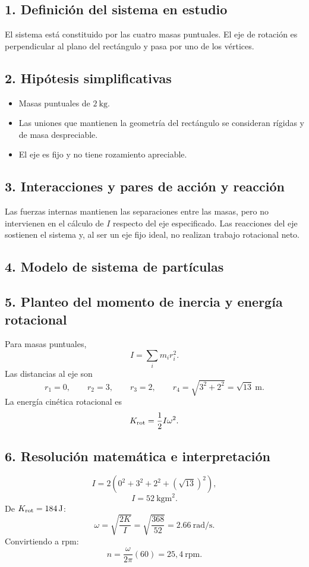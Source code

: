 \documentclass[12pt]{article}
\newcommand{\paso}[2]{%
  \subsection*{\color{AzulFisica}#1. #2}%
}
\begin{document}
\paso{1}{Definición del sistema en estudio}
El sistema está constituido por las cuatro masas puntuales. El eje de rotación es perpendicular al plano del rectángulo y pasa por uno de los vértices.

\paso{2}{Hipótesis simplificativas}
\begin{itemize}[itemsep=2pt]
  \item Masas puntuales de $\SI{2}{\kilogram}$.
  \item Las uniones que mantienen la geometría del rectángulo se consideran rígidas y de masa despreciable.
  \item El eje es fijo y no tiene rozamiento apreciable.
\end{itemize}

\paso{3}{Interacciones y pares de acción y reacción}
Las fuerzas internas mantienen las separaciones entre las masas, pero no intervienen en el cálculo de $I$ respecto del eje especificado. Las reacciones del eje sostienen el sistema y, al ser un eje fijo ideal, no realizan trabajo rotacional neto.

\paso{4}{Modelo de sistema de partículas}
\begin{center}
\end{center}

\paso{5}{Planteo del momento de inercia y energía rotacional}
Para masas puntuales,
\[
I=\sum_i m_i r_i^2.
\]
Las distancias al eje son
\[
r_1=0,\qquad r_2=3,\qquad r_3=2,\qquad r_4=\sqrt{3^2+2^2}=\sqrt{13}\ \si{\meter}.
\]
La energía cinética rotacional es
\[
K_{\rm rot}=\frac12I\omega^2.
\]

\paso{6}{Resolución matemática e interpretación}
\[
I=2\left(0^2+3^2+2^2+(\sqrt{13})^2\right),
\]
\[
\boxed{I=\SI{52}{\kilogram\meter\squared}}.
\]
De $K_{\rm rot}=\SI{184}{\joule}$:
\[
\omega=\sqrt{\frac{2K}{I}}=\sqrt{\frac{368}{52}}=\SI{2.66}{\radian\per\second}.
\]
Convirtiendo a rpm:
\[
n=\frac{\omega}{2\pi}(60)=\boxed{25,4\ \text{rpm}}.
\]
\end{document}
